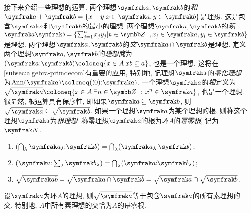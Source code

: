 接下来介绍一些理想的运算. 两个理想$\ideal{a}, \ideal{b}$的\emph{和}$\ideal{a}+\ideal{b}=\{x+y\vert x\in\ideal{a}, y\in\ideal{b}\}$是理想. 这是包含$\ideal{a}$和$\ideal{b}$的最小的理想. 两个理想$\ideal{a}, \ideal{b}$的\emph{积}$\ideal{a}\ideal{b}=\{\sum_{j=1}^n x_jy_j\vert n\in\ZZ_+, x_j\in\ideal{a}, y_j\in\ideal{b}\}$是理想. 两个理想$\ideal{a}, \ideal{b}$的\emph{交}$\ideal{a}\cap\ideal{b}$是理想. 定义两个理想$\ideal{a}, \ideal{b}$的\emph{理想商}为$(\ideal{a}{:}\ideal{b})\coloneq \{x\in A\vert xb\subseteq a\}$, 也是一个理想, 这将在\ref{subsec:algebra-primdecom}有重要的应用, 特别地, 记理想$\ideal{a}$的\emph{零化理想}为$\Ann(\ideal{a})\coloneq ((0){:}\ideal{a})$. 一个理想$\ideal{a}$的\emph{根}定义为$\sqrt{\ideal{a}}\coloneq \{x\in A\vert \exists n\in\ZZ_+\colon x^n\in\ideal{a}\}$, 也是一个理想. 很显然, 根运算具有保序性, 即如果$\ideal{a}\subseteq\ideal{b}$, 则$\sqrt{\ideal{a}}\subseteq\sqrt{\ideal{b}}$. 如果一个理想$\ideal{a}$为某个理想的根, 则称这个理想$\ideal{a}$为\emph{根理想}. 称零理想$\ideal{a}$的根为环$A$的\emph{幂零根}, 记为$\nil$.

\begin{proposition}\label{prop:idealop}\leavevmode
  \begin{enumerate}
    \item\label{enum:prop-idealop-quot-firstcap} $(\bigcap_\lambda \ideal{a}_\lambda{:}\ideal{b})=\bigcap_{\lambda}(\ideal{a}_\lambda{:}\ideal{b})$;
    \item $(\ideal{a}{:}\sum_{\lambda}\ideal{b}_\lambda)=\bigcap_{\lambda}(\ideal{a}{:}\ideal{b}_\lambda)$;
    \item\label{enum:prop-idealop-rad-inters} $\sqrt{\ideal{ab}}=\sqrt{\ideal{a}\cap\ideal{b}}=\sqrt{\ideal{a}}\cap\sqrt{\ideal{b}}$.
  \end{enumerate}
\end{proposition}

\begin{proposition}\label{prop:scheinnullstellensatz}
  设$\ideal{a}$为环$A$的理想, 则$\sqrt{\ideal{a}}$等于包含$\ideal{a}$的所有素理想的交. 特别地, $A$中所有素理想的交恰为$A$的幂零根.
\end{proposition}

